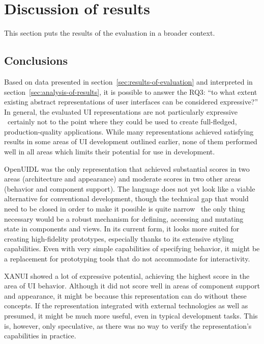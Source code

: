 \section{Discussion of results}\label{sec:evaluation-discussion-of-results}

This section puts the results of the evaluation in a broader context.

\subsection{Conclusions}\label{subsec:conclusions}

Based on data presented in section~\ref{sec:results-of-evaluation} and interpreted in section~\ref{sec:analysis-of-results}, it is possible to answer the RQ3: \enquote{to what extent existing abstract representations of user interfaces can be considered expressive?}
In general, the evaluated UI representations are not particularly expressive \textendash\ certainly not to the point where they could be used to create full-fledged, production-quality applications.
While many representations achieved satisfying results in some areas of UI development outlined earlier, none of them performed well in all areas which limits their potential for use in development.

OpenUIDL was the only representation that achieved substantial scores in two areas (architecture and appearance) and moderate scores in two other areas (behavior and component support).
The language does not yet look like a viable alternative for conventional development, though the technical gap that would need to be closed in order to make it possible is quite narrow \textendash\ the only thing necessary would be a robust mechanism for defining, accessing and mutating state in components and views.
In its current form, it looks more suited for creating high-fidelity prototypes, especially thanks to its extensive styling capabilities.
Even with very simple capabilities of specifying behavior, it might be a replacement for prototyping tools that do not accommodate for interactivity.

XANUI showed a lot of expressive potential, achieving the highest score in the area of UI behavior.
Although it did not score well in areas of component support and appearance, it might be because this representation can do without these concepts.
If the representation integrated with external technologies as well as presumed, it might be much more useful, even in typical development tasks.
This is, however, only speculative, as there was no way to verify the representation's capabilities in practice.

